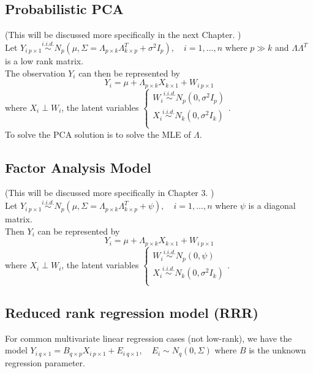 \documentclass[12pt]{book}
\theoremstyle{definition}
\theoremstyle{remark}
\begin{document}
\subsection{Probabilistic PCA}
(This will be discussed more specifically in the next Chapter. ) \\
Let $Y_{i \ p\times 1} \overset{i.i.d.}{\sim}N_p(\mu, \Sigma = \Lambda_{p\times k}\Lambda^T_{k\times p}+\sigma^2I_p),\quad i = 1,\dots, n$ where $p\gg k$ and $\Lambda\Lambda^T$ is a low rank matrix. \\
The observation $Y_i$ can then be represented by \[Y_i = \mu+\Lambda_{p\times k} X_{k\times 1}+W_{i \ p\times 1}\] 
where $X_i\perp W_i$, the latent variables $\begin{cases}
    W_i \overset{i.i.d.}{\sim}N_p(0,\sigma^2 I_p)\\
    X_i \overset{i.i.d.}{\sim}N_k(0,\sigma^2 I_k)\\
\end{cases}$.\\
To solve the PCA solution is to solve the MLE of $\Lambda$.\\

\subsection{Factor Analysis Model}
(This will be discussed more specifically in Chapter 3. ) \\
Let $Y_{i \ p\times 1} \overset{i.i.d.}{\sim}N_p(\mu, \Sigma = \Lambda_{p\times k}\Lambda^T_{k\times p}+\psi),\quad i = 1,\dots, n$ where $\psi$ is a diagonal matrix. \\
Then $Y_i$ can be represented by
\[Y_i = \mu+\Lambda_{p\times k} X_{k\times 1}+W_{i \ p\times 1}\]
where $X_i\perp W_i$, the latent variables $\begin{cases}
    W_i \overset{i.i.d.}{\sim}N_p(0,\psi)\\
    X_i \overset{i.i.d.}{\sim}N_k(0,\sigma^2 I_k)\\
\end{cases}$.

\subsection{Reduced rank regression model (RRR)}
For common multivariate linear regression cases (not low-rank), we have the model $Y_{i \ q\times 1} = B_{q\times p}X_{i \ p\times 1}+E_{i \ q\times 1}, \quad E_i \sim N_q(0,\Sigma)$ where $B$ is the unknown regression parameter.\\
\end{document}
